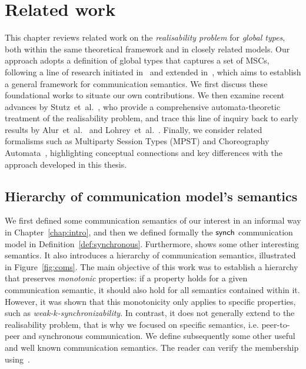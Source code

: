 \chapter{Related work}\label{sec:rel}
This chapter reviews related work on the \emph{realisability problem} for
\emph{global types}, both within the same theoretical framework and in
closely related models.  
Our approach adopts a definition of global types that captures a set of
MSCs, following a line of research initiated in~\cite{di2023partial} and
extended in~\cite{di2025realisability}, which aims to establish a
general framework for communication semantics.  
We first discuss these foundational works to situate our own
contributions.  
We then examine recent advances by
Stutz~et~al.~\cite{stutz2024implementability}, who provide a
comprehensive automata-theoretic treatment of the realisability problem,
and trace this line of inquiry back to early results by
Alur~et~al.~\cite{alur2000inference} and
Lohrey~et~al.~\cite{lohrey2003realizability}.  
Finally, we consider related formalisms such as Multiparty Session Types
(MPST) and Choreography Automata~\cite{barbanera2020choreography},
highlighting conceptual connections and key differences with the
approach developed in this thesis.

\section{Hierarchy of communication model's semantics}\label{sec:hier}
We first defined some communication semantics of our interest in an informal way 
in Chapter~\ref{chap:intro}, and then we defined formally the $\mathsf{synch}$
communication model in Definition~\ref{def:synchronous}.
Furthermore, \cite{di2023partial} shows some other interesting 
semantics. It also introduces a hierarchy of communication
semantics, illustrated in Figure~\ref{fig:coms}. The main objective of
this work was to establish a hierarchy that preserves \emph{monotonic}
properties: if a property holds for a given communication semantic, it
should also hold for all semantics contained within it. However, it was
shown that this monotonicity only applies to specific properties, such
as \emph{weak-$k$-synchronizability}. In contrast, it does not generally
extend to the realisability problem, that is why we focused
on specific semantics, i.e. peer-to-peer and synchronous communication. 
We define subsequently some other useful and
well known communication semantics. The reader can verify the membership
using~\cite{MSCTool}.


